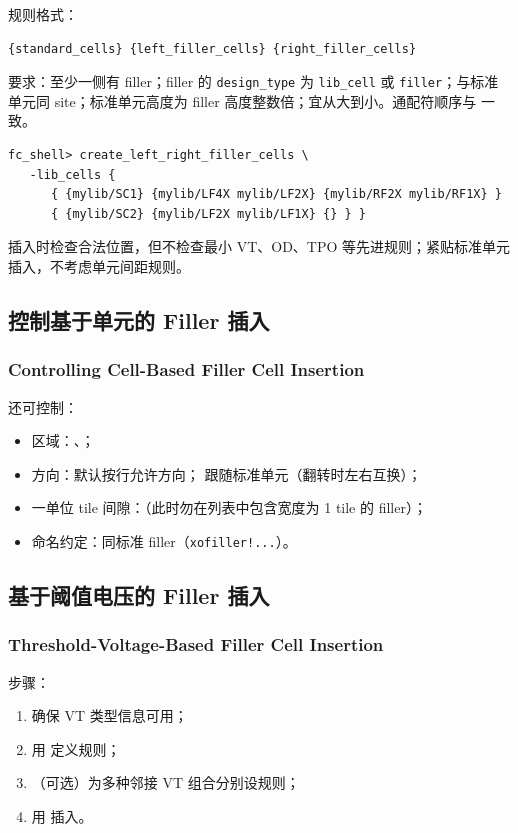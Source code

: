  规则格式：
\begin{lstlisting}
{standard_cells} {left_filler_cells} {right_filler_cells}
\end{lstlisting}

要求：至少一侧有 filler；filler 的 \texttt{design\_type} 为 \texttt{lib\_cell} 或 \texttt{filler}；与标准单元同 site；标准单元高度为 filler 高度整数倍；宜从大到小。通配符顺序与  一致。

\begin{lstlisting}
fc_shell> create_left_right_filler_cells \
   -lib_cells {
      { {mylib/SC1} {mylib/LF4X mylib/LF2X} {mylib/RF2X mylib/RF1X} }
      { {mylib/SC2} {mylib/LF2X mylib/LF1X} {} } }
\end{lstlisting}

插入时检查合法位置，但不检查最小 VT、OD、TPO 等先进规则；紧贴标准单元插入，不考虑单元间距规则。

\subsection{控制基于单元的 Filler 插入}
\subsubsection*{Controlling Cell-Based Filler Cell Insertion}

 还可控制：
\begin{itemize}
  \item 区域：、；
  \item 方向：默认按行允许方向； 跟随标准单元（翻转时左右互换）；
  \item 一单位 tile 间隙：\opt{-rules no\_1x}（此时勿在列表中包含宽度为 1 tile 的 filler）；
  \item 命名约定：同标准 filler（\texttt{xofiller!...}）。
\end{itemize}

\subsection{基于阈值电压的 Filler 插入}
\subsubsection*{Threshold-Voltage-Based Filler Cell Insertion}

步骤：
\begin{enumerate}
  \item 确保 VT 类型信息可用；
  \item 用  定义规则；
  \item （可选）为多种邻接 VT 组合分别设规则；
  \item 用  插入。
\end{enumerate}


